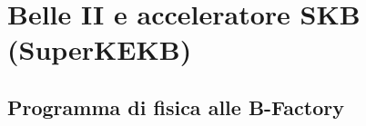 \chapter{Belle II e acceleratore SKB (SuperKEKB)}

\begin{comment}
Belle II è un esperimento general-purpose utilizzato nello studio dei parametri del Modello Standard (MS) e nella ricerca di Fisica oltre il MS (Beyond Standard Model, BSM).
In particolare l'esperimento studia la violazione di CP nei sistemi di mesoni B e cerca evidenze di Nuova Fisica (New Physic, NP) nei decadimenti dei mesoni B, dei mesoni D, nei leptoni $\tau$ e nel dark sector (settore della materia oscura), in particolare dei fotoni oscuri.
\end{comment}

\section{Programma di fisica alle B-Factory}


